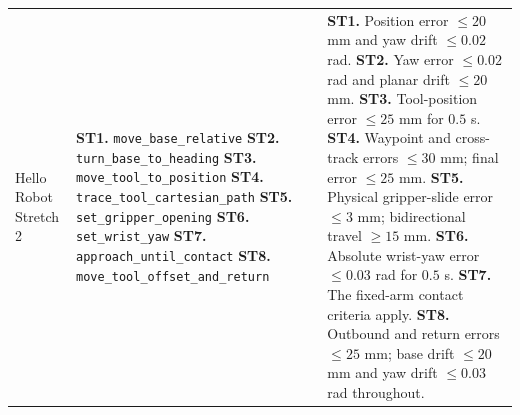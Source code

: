 \begin{longtable}{@{}>{\raggedright\arraybackslash}p{}
                        >{\raggedright\arraybackslash}p{}
                        >{\raggedright\arraybackslash}p{}@{}}
Hello Robot Stretch 2
&
\textbf{ST1.} \texttt{move\_base\_relative}\newline
\textbf{ST2.} \texttt{turn\_base\_to\_heading}\newline
\textbf{ST3.} \texttt{move\_tool\_to\_position}\newline
\textbf{ST4.} \texttt{trace\_tool\_cartesian\_path}\newline
\textbf{ST5.} \texttt{set\_gripper\_opening}\newline
\textbf{ST6.} \texttt{set\_wrist\_yaw}\newline
\textbf{ST7.} \texttt{approach\_until\_contact}\newline
\textbf{ST8.} \texttt{move\_tool\_offset\_and\_return}
&
\textbf{ST1.} Position error $\leq 20$ mm and yaw drift
$\leq 0.02$ rad.\newline
\textbf{ST2.} Yaw error $\leq 0.02$ rad and planar drift
$\leq 20$ mm.\newline
\textbf{ST3.} Tool-position error $\leq 25$ mm for $0.5$ s.\newline
\textbf{ST4.} Waypoint and cross-track errors $\leq 30$ mm; final error
$\leq 25$ mm.\newline
\textbf{ST5.} Physical gripper-slide error $\leq 3$ mm; bidirectional
travel $\geq 15$ mm.\newline
\textbf{ST6.} Absolute wrist-yaw error $\leq 0.03$ rad for $0.5$ s.\newline
\textbf{ST7.} The fixed-arm contact criteria apply.\newline
\textbf{ST8.} Outbound and return errors $\leq 25$ mm; base drift
$\leq 20$ mm and yaw drift $\leq 0.03$ rad throughout.
\\[3pt]


\end{longtable}
